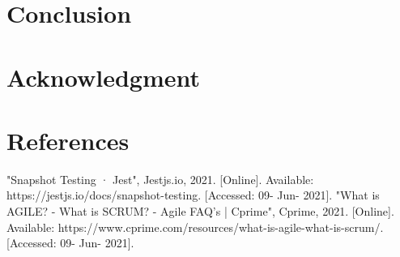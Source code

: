 \documentclass[conference]{IEEEtran}
\begin{document}
\section{Conclusion}


\section*{Acknowledgment}

\section*{References}


\begin{thebibliography}{00}
"Snapshot Testing · Jest", Jestjs.io, 2021. [Online]. Available: https://jestjs.io/docs/snapshot-testing. [Accessed: 09- Jun- 2021].
"What is AGILE? - What is SCRUM? - Agile FAQ's | Cprime", Cprime, 2021. [Online]. Available: https://www.cprime.com/resources/what-is-agile-what-is-scrum/. [Accessed: 09- Jun- 2021].
\end{thebibliography}
\end{document}
